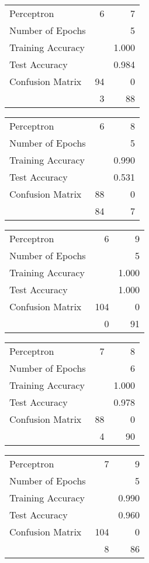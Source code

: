 \documentclass[11pt]{article}
\begin{document}
\begin{minipage}[t]{0.5\textwidth}
\begin{tabular}{|l | r r|}
\hline Perceptron & 6 & 7\\
Number of Epochs & & 5\\
Training Accuracy & & 1.000\\
Test Accuracy & & 0.984\\
Confusion Matrix & 94 & 0\\
 &3 & 88\\ \hline
\end{tabular}
\end{minipage}
\begin{minipage}[t]{0.5\textwidth}
\begin{tabular}{|l | r r|}
\hline Perceptron & 6 & 8\\
Number of Epochs & & 5\\
Training Accuracy & & 0.990\\
Test Accuracy & & 0.531\\
Confusion Matrix & 88 & 0\\
 &84 & 7\\ \hline
\end{tabular}
\end{minipage}
\begin{minipage}[t]{0.5\textwidth}
\begin{tabular}{|l | r r|}
\hline Perceptron & 6 & 9\\
Number of Epochs & & 5\\
Training Accuracy & & 1.000\\
Test Accuracy & & 1.000\\
Confusion Matrix & 104 & 0\\
 &0 & 91\\ \hline
\end{tabular}
\end{minipage}
\begin{minipage}[t]{0.5\textwidth}
\begin{tabular}{|l | r r|}
\hline Perceptron & 7 & 8\\
Number of Epochs & & 6\\
Training Accuracy & & 1.000\\
Test Accuracy & & 0.978\\
Confusion Matrix & 88 & 0\\
 &4 & 90\\ \hline
\end{tabular}
\end{minipage}
\begin{minipage}[t]{0.5\textwidth}
\begin{tabular}{|l | r r|}
\hline Perceptron & 7 & 9\\
Number of Epochs & & 5\\
Training Accuracy & & 0.990\\
Test Accuracy & & 0.960\\
Confusion Matrix & 104 & 0\\
 &8 & 86\\ \hline
\end{tabular}
\end{minipage}
\end{document}
